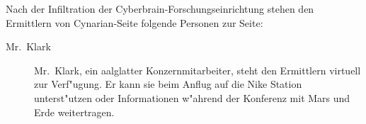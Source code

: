 
Nach der Infiltration der Cyberbrain-Forschungseinrichtung stehen den Ermittlern von Cynarian-Seite folgende Personen zur Seite:

\begin{description}
    \item [Mr.~Klark] Mr.~Klark, ein aalglatter Konzernmitarbeiter, steht den Ermittlern virtuell zur Verf"ugung. Er kann sie beim Anflug auf die Nike Station unterst"utzen oder Informationen w"ahrend der Konferenz mit Mars und Erde weitertragen.
\end{description}
